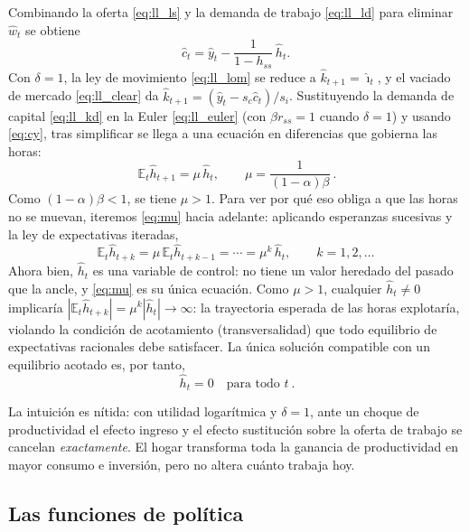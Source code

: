 \documentclass[11pt,a4paper]{report}
\newcounter{tcbrem}[section]
\renewcommand{\thetcbrem}{\thesection.\arabic{tcbrem}}
\newenvironment{remark}{%
  \refstepcounter{tcbrem}%
  \begin{tcolorbox}[remarkstyle, title={Observación~\thetcbrem}]}%
{\end{tcolorbox}}
\newcommand{\E}{\mathbb{E}}
\begin{document}
Combinando la oferta \eqref{eq:ll_ls} y la demanda de trabajo \eqref{eq:ll_ld}
para eliminar $\hat{w}_t$ se obtiene
\begin{equation}
\hat{c}_t=\hat{y}_t-\frac{1}{1-h_{ss}}\,\hat{h}_t. \label{eq:cy}
\end{equation}
Con $\delta=1$, la ley de movimiento \eqref{eq:ll_lom} se reduce a
$\hat{k}_{t+1}=\hat{\imath}_t$, y el vaciado de mercado \eqref{eq:ll_clear} da
$\hat{k}_{t+1}=(\hat{y}_t-s_c\hat{c}_t)/s_i$. Sustituyendo la demanda de capital
\eqref{eq:ll_kd} en la Euler \eqref{eq:ll_euler} (con $\beta r_{ss}=1$ cuando
$\delta=1$) y usando \eqref{eq:cy}, tras simplificar se llega a una ecuación en
diferencias que gobierna las horas:
\begin{equation}
\boxed{\ \E_t\hat{h}_{t+1}=\mu\,\hat{h}_t,\qquad \mu=\frac{1}{(1-\alpha)\beta}\ }. \label{eq:mu}
\end{equation}
Como $(1-\alpha)\beta<1$, se tiene $\mu>1$. Para ver por qué eso obliga a que las
horas no se muevan, iteremos \eqref{eq:mu} hacia adelante: aplicando esperanzas
sucesivas y la ley de expectativas iteradas,
\[
\E_t\hat{h}_{t+k}=\mu\,\E_t\hat{h}_{t+k-1}=\cdots=\mu^{k}\,\hat{h}_t,
\qquad k=1,2,\dots
\]
Ahora bien, $\hat{h}_t$ es una variable de control: no tiene un valor heredado
del pasado que la ancle, y \eqref{eq:mu} es su única ecuación. Como $\mu>1$,
cualquier $\hat{h}_t\neq0$ implicaría $|\E_t\hat{h}_{t+k}|=\mu^{k}|\hat{h}_t|\to\infty$:
la trayectoria esperada de las horas explotaría, violando la condición de
acotamiento (transversalidad) que todo equilibrio de expectativas racionales
debe satisfacer. La única solución compatible con un equilibrio acotado es, por
tanto,
\begin{equation}
\boxed{\ \hat{h}_t=0\quad\text{para todo }t\ }. \label{eq:hzero}
\end{equation}

\begin{remark}
La intuición es nítida: con utilidad logarítmica y $\delta=1$, ante un choque de
productividad el efecto ingreso y el efecto sustitución sobre la oferta de
trabajo se cancelan \emph{exactamente}. El hogar transforma toda la ganancia de
productividad en mayor consumo e inversión, pero no altera cuánto trabaja hoy.
\end{remark}

\subsection{Las funciones de política}
\end{document}
